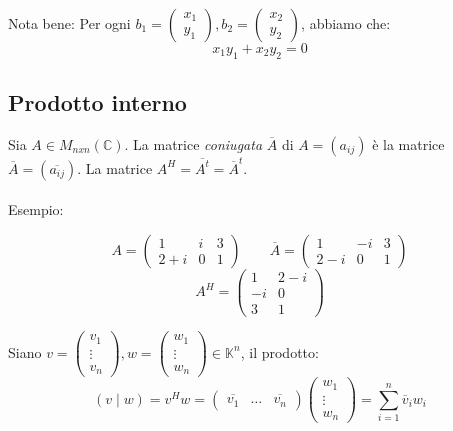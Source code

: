 \documentclass[12pt]{article}
\begin{document}
Nota bene: Per ogni $b_1 = \begin{pmatrix}
    x_1\\
    y_1
\end{pmatrix}, b_2 = \begin{pmatrix}
    x_2\\
    y_2
\end{pmatrix}$, abbiamo che: \[x_1y_1 + x_2y_2 = 0\]



\subsection{Prodotto interno}

Sia $A \in M_{nxn} (\mathbb{C})$. La matrice \textit{coniugata} $\overline{A}$ di $A = (a_{ij}) $ è la matrice $\overline{A} = (\overline{a_{ij}})$. La matrice $A^H = \overline{A^t} = \overline{A}^t$.\\\\
Esempio:

\[A = \begin{pmatrix}
    1 & i & 3\\
    2+i & 0 & 1
\end{pmatrix} \quad \quad \overline{A} = \begin{pmatrix}
    1 & -i & 3\\
    2-i & 0 & 1
\end{pmatrix}\]
\[A^H = \begin{pmatrix}
    1 & 2-i\\
    -i & 0\\
    3 & 1
\end{pmatrix}\]

Siano $v = \begin{pmatrix}
    v_1\\
    \vdots\\
    v_n
\end{pmatrix}, w = \begin{pmatrix}
    w_1\\
    \vdots\\
    w_n
\end{pmatrix} \in \mathbb{K}^n$, il prodotto: \[(v \mid w) = v^Hw = \begin{pmatrix}
    \overline{v_1} & \dots & \overline{v_n}
\end{pmatrix} \begin{pmatrix}
    w_1\\
    \vdots\\
    w_n
\end{pmatrix} = \sum^{n}_{i=1}\overline{v}_i w_i\]
\end{document}
